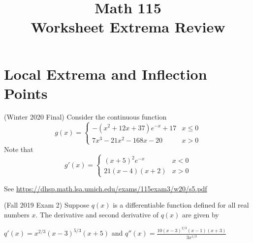 \documentclass[11pt]{exam}
\title{\vspace{-0.5in} Math 115\\ Worksheet Extrema Review}
\date{}
\begin{document}
\maketitle
\vspace{-0.75in}
\section*{Local Extrema and Inflection Points}
\begin{questions}
\question (Winter 2020 Final)
  Consider the continuous function \[
    g(x) =
    \begin{cases}
      -(x^2+12x+37) e^{-x} + 17 & x \leq 0\\
      7x^3 - 21 x^2 - 168 x - 20 & x > 0
    \end{cases}
  \]
  Note that \[
    g'(x) =
    \begin{cases}
      (x+5)^2 e^{-x} & x < 0 \\
      21(x-4)(x+2) & x > 0
    \end{cases}
  \]
  \begin{solution}
    See \href{https://dhsp.math.lsa.umich.edu/exams/115exam3/w20/s5.pdf}{https://dhsp.math.lsa.umich.edu/exams/115exam3/w20/s5.pdf}
  \end{solution}
  \question (Fall 2019 Exam 2) %
    Suppose \(q(x)\) is a differentiable function defined for all real numbers \(x\). The derivative
and second derivative of \(q(x)\) are given by 
\begin{center}
  \(q'(x) = x^{2/3}(x - 3)^{5/3}(x + 5)\) and
  \(q''(x) = \frac{10(x - 3)^{2/3}(x - 1)(x + 3)}{3x^{1/3}}\)
\end{center}
\end{questions}
\end{document}
